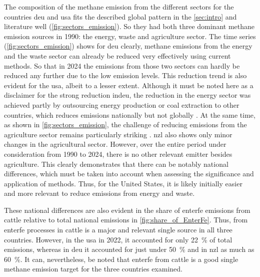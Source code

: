 The composition of the methane emission from the different sectors for the countries \acrshort{deu} and \acrshort{usa} fits the described global pattern in the \cref{sec:intro} and literature \parencite{appelhansUnterschatztesTreibhausgasMethan2025, mundraEmergentMethaneMitigation2024} well (\cref{fig:sectors_emission}). So they had both three dominant methane emission sources in 1990: the energy, waste and agriculture sector.
The time series (\cref{fig:sectors_emission}) shows for \acrshort{deu} clearly, methane emissions from the energy and the waste sector can already be reduced very effectively using current methods. So that in 2024 the emissions from those two sectors can hardly be reduced any further due to the low emission levels. This reduction trend is also evident for the \acrshort{usa}, albeit to a lesser extent. Although it must be noted here as a disclaimer for the strong reduction in\acrshort{deu}, the reduction in the energy sector was achieved partly by outsourcing energy production or coal extraction to other countries, which reduces emissions nationally but not globally \parencite{appelhansUnterschatztesTreibhausgasMethan2025}. At the same time, as shown in \cref{fig:sectors_emission}, the challenge of reducing emissions from the agriculture sector remains particularly striking \parencite{edelenboschReducingSectoralHardtoabate2024, intergovernmentalpanelonclimatechangeipccAgricultureForestryOther2022}.
\acrshort{nzl} also shows only minor changes in the agricultural sector. However, over the entire period under consideration from 1990 to 2024, there is no other relevant  emitter besides agriculture. This clearly demonstrates that there can be notably national differences, which must be taken into account when assessing the significance and application of methods. Thus, for the United States, it is likely initially easier and more relevant to reduce emissions from energy and waste.

These national differences are also evident in the share of \acrshort{enterfe}  emissions from cattle relative to total national emissions in \cref{fig:share_of_EnterFe}. Thus,  from \acrlong{enterfe} processes in cattle is a major and relevant single source in all three countries. However, in the \acrshort{usa} in 2022, it accounted for only 22~\% of total emissions, whereas in \acrshort{deu} it accounted for just under 50~\% and in \acrshort{nzl} as much as 60~\%. It can, nevertheless, be noted that \acrshort{enterfe} from cattle is a good single methane emission target for the three countries examined.

